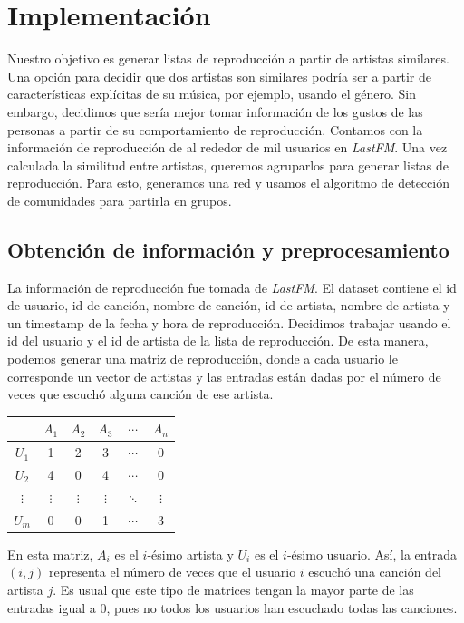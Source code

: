 \documentclass[conference]{IEEEtran}
\begin{document}
\section{Implementación}

Nuestro objetivo es generar listas de reproducción a partir de artistas similares. Una opción para decidir que dos artistas son similares podría ser a partir de características explícitas de su música, por ejemplo, usando el género. Sin embargo, decidimos que sería mejor tomar información de los gustos de las personas a partir de su comportamiento de reproducción. Contamos con la información de reproducción de al rededor de mil usuarios en \textit{LastFM}.
Una vez calculada la similitud entre artistas, queremos agruparlos para generar listas de reproducción. Para esto, generamos una red y usamos el algoritmo de detección de comunidades para partirla en grupos.

\subsection{Obtención de información y preprocesamiento}

La información de reproducción fue tomada de \textit{LastFM}. El dataset contiene el id de usuario, id de canción, nombre de canción, id de artista, nombre de artista y un timestamp de la fecha y hora de reproducción. Decidimos trabajar usando el id del usuario y el id de artista de la lista de reproducción. De esta manera, podemos generar una matriz de reproducción, donde a cada usuario le corresponde un vector de artistas y las entradas están dadas por el número de veces que escuchó alguna canción de ese artista.
\begin{center}
     \begin{tabular}{ c | c  c c c c}
         & $A_1$ & $A_2$ & $A_3$ & $\cdots$ & $A_n$ \\
       \hline                       
       $U_1$ &   1 &     2 &     3 & $\cdots$ &      0 \\
       $U_2$ &   4 &     0 &     4 & $\cdots$  &     0\\
       $\vdots$ & $\vdots$ & $\vdots$ & $\vdots$ & $\ddots$ & $\vdots$\\
       $U_m$ &   0 &     0 &     1 & $\cdots$ &      3\\
      \hline  
   \end{tabular}
\end{center}

En esta matriz, $A_i$ es el $i$-ésimo artista y $U_i$ es el $i$-ésimo usuario. Así, la entrada $(i, j)$ representa el número de veces que el usuario $i$ escuchó una canción del artista $j$. Es usual que este tipo de matrices tengan la mayor parte de las entradas igual a $0$, pues no todos los usuarios han escuchado todas las canciones.
\end{document}
